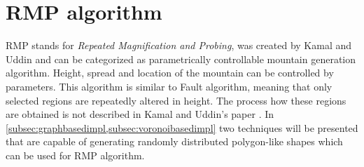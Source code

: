 \documentclass[11pt,a4paper,twoside,openright]{report}
\begin{document}
\section{RMP algorithm}
RMP stands for \emph{Repeated Magnification and Probing}, was created by Kamal and Uddin \cite{Kamal:2007:PCT:1321261.1321264} and can be categorized as parametrically controllable mountain generation algorithm. Height, spread and location of the mountain can be controlled by parameters. This algorithm is similar to Fault algorithm, meaning that only selected regions are repeatedly altered in height. The process how these regions are obtained is not described in Kamal and Uddin's paper \cite{Kamal:2007:PCT:1321261.1321264}. In \cref{subsec:graphbasedimpl,subsec:voronoibasedimpl} two techniques will be presented that are capable of generating randomly distributed polygon-like shapes which can be used for RMP algorithm.
\end{document}
